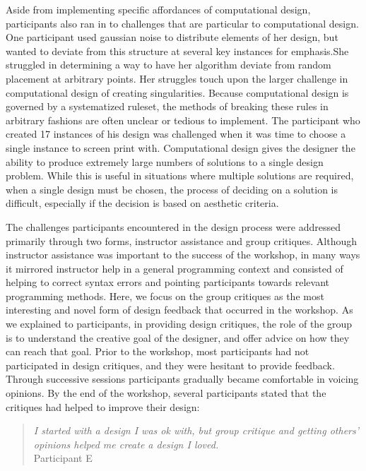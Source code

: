 \documentclass{sigchi}
\begin{document}
Aside from implementing specific affordances of computational design, participants also ran in to challenges that are particular to computational design. One participant used gaussian noise to distribute elements of her design, but wanted to deviate from this structure at several key instances for emphasis.She struggled in determining a way to have her algorithm deviate from random placement at arbitrary points. Her struggles touch upon the larger challenge in computational design of creating singularities. Because computational design is governed by a systematized ruleset, the methods of breaking these rules in arbitrary fashions are often unclear or tedious to implement. The participant who created 17 instances of his design was challenged when it was time to choose a single instance to screen print with. Computational design gives the designer the ability to produce extremely large numbers of solutions to a single design problem. While this is useful in situations where multiple solutions are required, when a single design must be chosen, the process of deciding on a solution is difficult, especially if the decision is based on aesthetic criteria.

The challenges participants encountered in the design process were addressed primarily through two forms, instructor assistance and group critiques. Although instructor assistance was important to the success of the workshop, in many ways it mirrored instructor help in a general programming context and consisted of helping to correct syntax errors and pointing participants towards relevant programming methods. Here, we focus on the group critiques as the most interesting and novel form of design feedback that occurred in the workshop. As we explained to participants, in providing design critiques, the role of the group is to understand the creative goal of the designer, and offer advice on how they can reach that goal. Prior to the workshop, most participants had not participated in design critiques, and they were hesitant to provide feedback. Through successive sessions participants gradually became comfortable in voicing opinions. By the end of the workshop, several participants stated that the critiques had helped to improve their design:
\begin{quotation}
	\textit{I started with a design I was ok with, but group critique and getting others' opinions helped me create a design I loved.}
	\\Participant E
\end{quotation}
\end{document}
